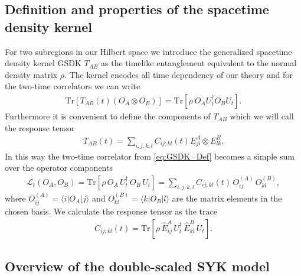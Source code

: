 \documentclass[11pt,a4paper]{article}
\begin{document}
\subsection{Definition and properties of the spacetime density kernel}
For two subregions in our Hilbert space we introduce the generalized spacetime density kernel GSDK $T_{AB}$ as the timelike entanglement equivalent to the normal density matrix $\rho$. The kernel encodes all time dependency of our theory and for the two-time correlators we can write
\begin{align}
	 \mathrm{Tr} \left[ T_{AB} (t) (O_{A} \otimes O_{B} ) \right] = \mathrm{Tr} \left[ \rho \ O_{A} U^{\dagger}_{t} O_{B} U_{t} \right].
	 \label{eq:GSDK_Def}
\end{align}
Furthermore it is convenient to define the components of $T_{AB}$ which we will call the response tensor
\begin{align}
	T_{AB}(t) = \sum_{i,j,k,l} C_{ij;kl} (t) E_{ji}^{A} \otimes E_{lk}^{B}.
	\label{eq:}
\end{align}
In this way the two-time correlator from \eqref{eq:GSDK_Def} becomes a simple sum over the operator components
\begin{align}
    \mathcal{L}_t(O_A, O_B)
    = \text{Tr}\left[\rho\,O_A\,U_t^\dagger\,O_B\,U_t\right]
    = \sum_{i,j,k,l} C_{ij;kl}(t)\,O^{(A)}_{ij}\,O^{(B)}_{kl},
    \label{eq:correlator_from_SDK}
\end{align}
where $O^{(A)}_{ij} = \langle i|O_A|j\rangle$ and $O^{(B)}_{kl} = \langle k|O_B|l\rangle$
are the matrix elements in the chosen basis.
We calculate the response tensor as the trace
\begin{align}
    C_{ij;kl}(t) = \text{Tr}\left[\rho\,\hat{E}^A_{ij}\,U_t^\dagger\,\hat{E}^B_{kl}\,U_t\right].
    \label{eq:SDK_def}
\end{align}

\subsection{Overview of the double-scaled SYK model}
\label{subs:DSSYK_basics}
\end{document}
